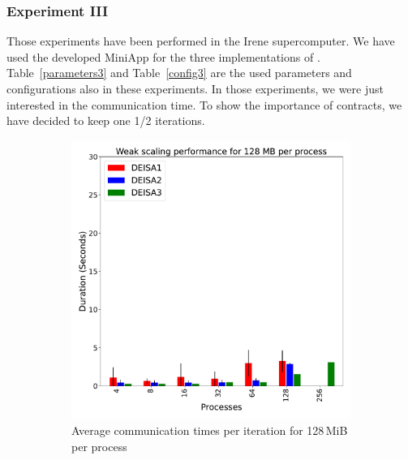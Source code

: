 \subsubsection{Experiment III}\label{XP3}
Those experiments have been performed in the Irene supercomputer. We have used the developed MiniApp for the three implementations of \deisa. Table~\ref{parameters3}  and Table~\ref{config3} are the used parameters and configurations also in these experiments. In those experiments, we were just interested in the communication time. 
To show the importance of contracts, we have decided to keep one 1/2 iterations.
 
\begin{figure}
     \centering
     \begin{subfigure}[b]{0.4\textwidth}
         \centering
         \includegraphics[width=\textwidth, height=\textwidth]{figures/128MB_1vs2vs3.pdf}
         \caption{Average communication times per iteration for 128\,MiB per process}
         \label{fig:X2_128}
     \end{subfigure}
     \hfill
     \begin{subfigure}[b]{0.4\textwidth}
         \centering

\end{subfigure}
\end{figure}

